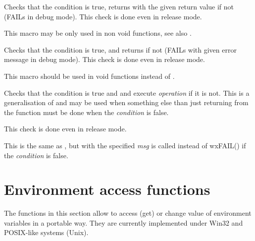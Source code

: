 
Checks that the condition is true, returns with the given return value if not (FAILs in debug mode).
This check is done even in release mode.

This macro may be only used in non void functions, see also
.

\label{wxcheckret}


Checks that the condition is true, and returns if not (FAILs with given error
message in debug mode). This check is done even in release mode.

This macro should be used in void functions instead of
.

\label{wxcheck2}


Checks that the condition is true and  and execute
{\it operation} if it is not. This is a generalisation of
 and may be used when something else than just
returning from the function must be done when the {\it condition} is false.

This check is done even in release mode.

\label{wxcheck2msg}


This is the same as , but
 with the specified {\it msg} is called
instead of wxFAIL() if the {\it condition} is false.

\section{Environment access functions}\label{environfunctions}

The functions in this section allow to access (get) or change value of
environment variables in a portable way. They are currently implemented under
Win32 and POSIX-like systems (Unix).



